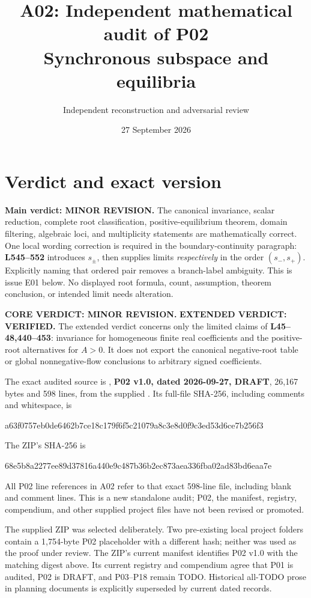 \documentclass[11pt]{article}
\title{A02: Independent mathematical audit of P02\\
Synchronous subspace and equilibria}
\author{Independent reconstruction and adversarial review}
\date{27 September 2026}
\newcommand{\lin}[1]{\textbf{L#1}}
\newcommand{\sha}[2]{\par{\small\ttfamily #1\allowbreak #2}\par}
\begin{document}
\maketitle

\section{Verdict and exact version}

\textbf{Main verdict: MINOR REVISION.}
The canonical invariance, scalar reduction, complete root classification,
positive-equilibrium theorem, domain filtering, algebraic loci, and
multiplicity statements are mathematically correct. One local wording
correction is required in the boundary-continuity paragraph:
\lin{545--552} introduces \(s_\pm\), then supplies limits
\emph{respectively} in the order \((s_-,s_+)\).
Explicitly naming that ordered pair removes a branch-label ambiguity.
This is issue E01 below. No displayed root formula, count, assumption,
theorem conclusion, or intended limit needs alteration.

\textbf{CORE VERDICT: MINOR REVISION.}\quad
\textbf{EXTENDED VERDICT: VERIFIED.}
The extended verdict concerns only the limited claims of
\lin{45--48,440--453}: invariance for homogeneous finite real coefficients
and the positive-root alternatives for \(A>0\). It does not export the
canonical negative-root table or global nonnegative-flow conclusions
to arbitrary signed coefficients.

The exact audited source is
,
\textbf{P02 v1.0, dated 2026-09-27, DRAFT}, 26,167 bytes and 598 lines,
from the supplied .
Its full-file SHA-256, including comments and whitespace, is
\sha{a63f0757eb0de6462b7ce18c179f6f5c21}{079a8c3e8d0f9c3ed53d6ce7b256f3}
The ZIP's SHA-256 is
\sha{68e5b8a2277ee89d37816a440e9c487b36}{b2ec873aea336fba02ad83bd6eaa7e}
All P02 line references in A02 refer to that exact 598-line file,
including blank and comment lines. This is a new standalone audit;
P02, the manifest, registry, compendium, and other supplied project
files have not been revised or promoted.

The supplied ZIP was selected deliberately. Two pre-existing local
project folders contain a 1,754-byte P02 placeholder with a different
hash; neither was used as the proof under review. The ZIP's current
manifest identifies P02 v1.0 with the matching digest above. Its current
registry and compendium agree that P01 is audited, P02 is DRAFT, and
P03--P18 remain TODO. Historical all-TODO prose in planning documents
is explicitly superseded by current dated records.
\end{document}
